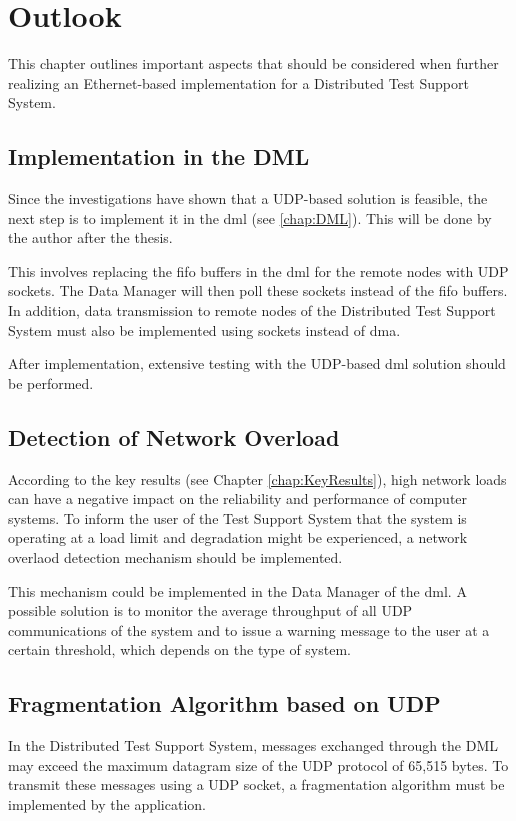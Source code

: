\chapter{Outlook} \label{chap:Outlook}
This chapter outlines important aspects that should be considered when further realizing an Ethernet-based implementation for a Distributed Test Support System.

\section{Implementation in the DML}
Since the investigations have shown that a UDP-based solution is feasible, the next step is to implement it in the \acf{dml} (see \ref{chap:DML}). This will be done by the author after the thesis.

This involves replacing the \ac{fifo} buffers in the \ac{dml} for the remote nodes with UDP sockets. The Data Manager will then poll these sockets instead of the \ac{fifo} buffers. In addition, data transmission to remote nodes of the Distributed Test Support System must also be implemented using sockets instead of \ac{dma}.

After implementation, extensive testing with the UDP-based \ac{dml} solution should be performed.

\section{Detection of Network Overload}
According to the key results (see Chapter \ref{chap:KeyResults}), high network loads can have a negative impact on the reliability and performance of computer systems. To inform the user of the Test Support System that the system is operating at a load limit and degradation might be experienced, a network overlaod detection mechanism should be implemented.

This mechanism could be implemented in the Data Manager of the \ac{dml}. A possible solution is to monitor the average throughput of all UDP communications of the system and to issue a warning message to the user at a certain threshold, which depends on the type of system.

\section{Fragmentation Algorithm based on UDP} \label{chap:fragProposalOutlook}
In the Distributed Test Support System, messages exchanged through the DML may exceed the maximum datagram size of the UDP protocol of 65,515 bytes. To transmit these messages using a UDP socket, a fragmentation algorithm must be implemented by the application.

